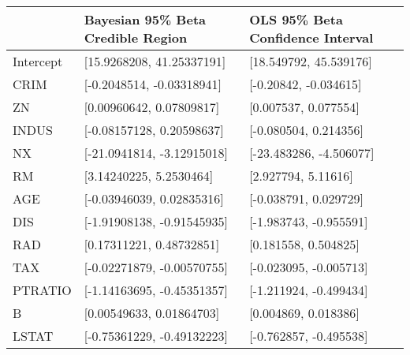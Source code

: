 \begin{tabular}{lll}
\hline
           & Bayesian 95\% Beta Credible Region   & OLS 95\% Beta Confidence Interval   \\
\hline
 Intercept & [15.9268208, 41.25337191]           & [18.549792, 45.539176]             \\
 CRIM      & [-0.2048514, -0.03318941]           & [-0.20842, -0.034615]              \\
 ZN        & [0.00960642, 0.07809817]            & [0.007537, 0.077554]               \\
 INDUS     & [-0.08157128, 0.20598637]           & [-0.080504, 0.214356]              \\
 NX        & [-21.0941814, -3.12915018]          & [-23.483286, -4.506077]            \\
 RM        & [3.14240225, 5.2530464]             & [2.927794, 5.11616]                \\
 AGE       & [-0.03946039, 0.02835316]           & [-0.038791, 0.029729]              \\
 DIS       & [-1.91908138, -0.91545935]          & [-1.983743, -0.955591]             \\
 RAD       & [0.17311221, 0.48732851]            & [0.181558, 0.504825]               \\
 TAX       & [-0.02271879, -0.00570755]          & [-0.023095, -0.005713]             \\
 PTRATIO   & [-1.14163695, -0.45351357]          & [-1.211924, -0.499434]             \\
 B         & [0.00549633, 0.01864703]            & [0.004869, 0.018386]               \\
 LSTAT     & [-0.75361229, -0.49132223]          & [-0.762857, -0.495538]             \\
\hline
\end{tabular}